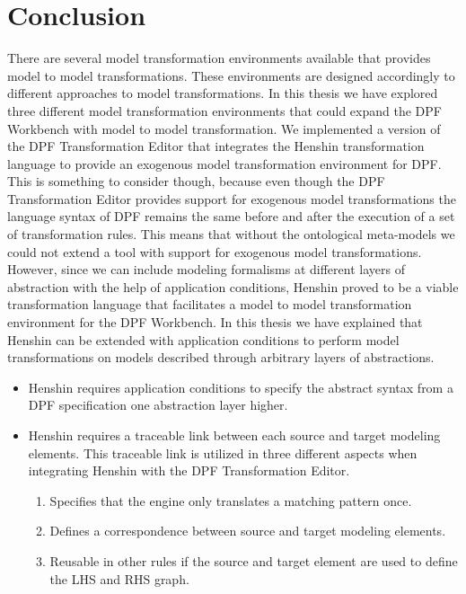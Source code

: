 
\chapter{Conclusion} %

\label{Chapter7} %


There are several model transformation environments available that provides
model to model transformations. These environments are designed accordingly
to different approaches to model transformations. In this thesis we have
explored three different model transformation environments that could expand the
DPF Workbench with model to model transformation. We implemented a version of
the DPF Transformation Editor that integrates the Henshin transformation language
to provide an exogenous model transformation environment for DPF.
This is something to consider though, because even though the DPF Transformation
Editor provides support for exogenous model transformations the language syntax
of DPF remains the same before and after the execution of a set of
transformation rules. This means that without the ontological meta-models we
could not extend a tool with support for exogenous model transformations.
However, since we can include modeling formalisms at different layers of
abstraction with the help of application conditions, Henshin proved to be a
viable transformation language that facilitates a model to model transformation
environment for the DPF Workbench. In this thesis we have explained that
Henshin can be extended with application conditions to perform model
transformations on models described through arbitrary layers of abstractions.

\begin{itemize}
  \item Henshin requires application conditions to specify the abstract
  syntax from a DPF specification one abstraction layer higher.
   \item Henshin requires a traceable link between each source and target
   modeling elements. This traceable link is utilized in three different aspects when
  integrating Henshin with the DPF Transformation Editor. 
	\begin{enumerate} 
	  	\item Specifies that the engine only translates a matching pattern once.
        \item Defines a correspondence between source and target modeling
        elements. 
        \item Reusable in other rules if the source and target element are used
        to define the LHS and RHS graph.
     \end{enumerate}
     
\end{itemize}

